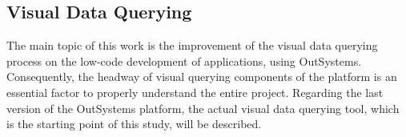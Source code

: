 
\subsection{Visual Data Querying}
\label{subsec:visual_data_querying}

The main topic of this work is the improvement of the visual data querying process on the low-code development of applications, using OutSystems. Consequently, the headway of visual querying components of the platform is an essential factor to properly understand the entire project. Regarding the last version of the OutSystems platform, the actual visual data querying tool, which is the starting point of this study, will be described.

